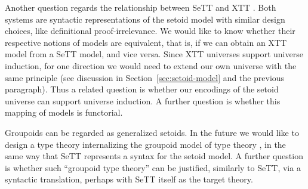 \documentclass[a4paper,UKenglish,cleveref, autoref, thm-restate]{lipics-v2019}
\begin{document}
Another question regards the relationship between SeTT \cite{mpc19} and XTT
\cite{xtt}. Both systems are syntactic representations of the setoid model with
similar design choices, like definitional proof-irrelevance. We would like to
know whether their respective notions of models are equivalent, that is, if we
can obtain an XTT model from a SeTT model, and vice versa. Since XTT universes
support universe induction, for one direction we would need to extend our own
universe with the same principle (see discussion in
Section~\ref{sec:setoid-model} and the previous paragraph). Thus a related
question is whether our encodings of the setoid universe can support universe
induction. A further question is whether this mapping of models is functorial.

Groupoids can be regarded as generalized setoids. In the future we would like to
design a type theory internalizing the groupoid model of type theory
\cite{groupoid}, in the same way that SeTT represents a syntax for the setoid
model. A further question is whether such ``groupoid type theory'' can be
justified, similarly to SeTT, via a syntactic translation, perhaps with SeTT
itself as the target theory.


\end{document}
